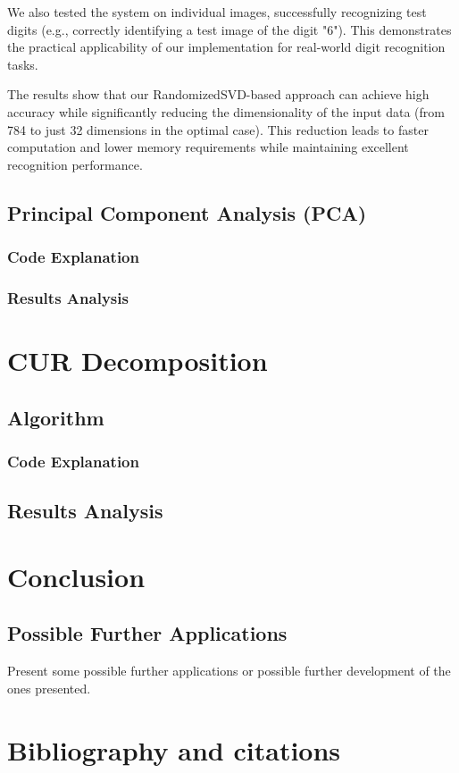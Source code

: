 \documentclass[11pt,a4paper]{article}
\begin{document}
We also tested the system on individual images, successfully recognizing test digits (e.g., correctly identifying a test image of the digit "6"). This demonstrates the practical applicability of our implementation for real-world digit recognition tasks.

The results show that our RandomizedSVD-based approach can achieve high accuracy while significantly reducing the dimensionality of the input data (from 784 to just 32 dimensions in the optimal case). This reduction leads to faster computation and lower memory requirements while maintaining excellent recognition performance.

\subsection{Principal Component Analysis (PCA)}
\subsubsection{Code Explanation}
\subsubsection{Results Analysis}


\section{CUR Decomposition}
\subsection{Algorithm}
\subsubsection{Code Explanation}
\subsection{Results Analysis}
\section{Conclusion}
\subsection{Possible Further Applications}
Present some possible further applications or possible further development of the ones presented.

\section{Bibliography and citations}
\end{document}
